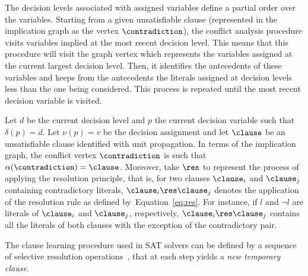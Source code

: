 The decision levels associated with assigned variables define a partial order
over the variables. Starting from a given unsatisfiable clause (represented in
the implication graph as the vertex $\contradiction$), the conflict analysis
procedure visits variables implied at the most recent decision level. This means
that this procedure will visit the graph vertex which represents the variables
assigned at the current largest decision level. Then, it identifies the
antecedents of these variables and keeps from the antecedents the literals
assigned at decision levels less than the one being considered. This process is
repeated until the most recent decision variable is visited.

Let $d$ be the current decision level and $p$ the current decision variable such that
$\delta(p) = d$. Let $\nu(p) = v$ be the decision assignment and let $\clause$
be an unsatisfiable clause identified with unit propagation. In terms of the
implication graph, the conflict vertex $\contradiction$ is such that
$\alpha(\contradiction) = \clause$. Moreover, take $\res$ to represent the
process of applying the resolution principle, that is, for two clauses
$\clause_i$ and $\clause_j$ containing contradictory literals, $\clause_i \res
\clause_j$ denotes the application of the resolution rule as defined
by~Equation~\ref{eq:res}. For instance, if $l$ and $\neg l$ are literals of
$\clause_i$ and $\clause_j$, respectively, $\clause_i \res \clause_j$ contains
all the literals of both clauses with the exception of the contradictory pair.

The clause learning procedure used in SAT solvers can be defined by a sequence
of selective resolution operations~\cite{journals/corr/abs-1107-0044,DAC00*675},
that at each step yields a \emph{new temporary clause}. 

